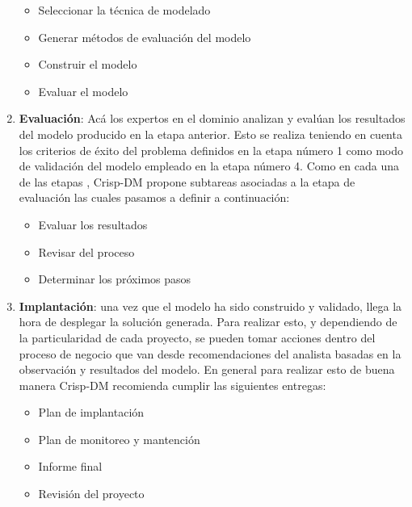 \begin{enumerate}
    \begin{itemize}
        \item Seleccionar la técnica de modelado
        \item Generar métodos de evaluación del modelo
        \item Construir el modelo
        \item Evaluar el modelo
    \end{itemize}
    \item \textbf{Evaluación}: Acá los expertos en el dominio analizan y evalúan los resultados del modelo producido en la etapa anterior. Esto se realiza teniendo en cuenta los criterios de éxito del problema definidos en la etapa número 1 como modo de validación del modelo empleado en la etapa número 4. Como en cada una de las etapas , Crisp-DM propone subtareas asociadas a la etapa de evaluación las cuales pasamos a definir a continuación:
    \begin{itemize}
        \item Evaluar los resultados
        \item Revisar del proceso
        \item Determinar los próximos pasos
    \end{itemize}
    \item \textbf{Implantación}: una vez que el modelo ha sido construido y validado, llega la hora de desplegar la solución generada. Para realizar esto, y dependiendo de la particularidad de cada proyecto, se pueden tomar acciones dentro del proceso de negocio que van desde recomendaciones del analista basadas en la observación y resultados del modelo. En general para realizar esto de buena manera Crisp-DM recomienda cumplir las siguientes entregas: 
    \begin{itemize}
        \item Plan de implantación
        \item Plan de monitoreo y mantención
        \item Informe final
        \item Revisión del proyecto
    \end{itemize}
\end{enumerate}
    
